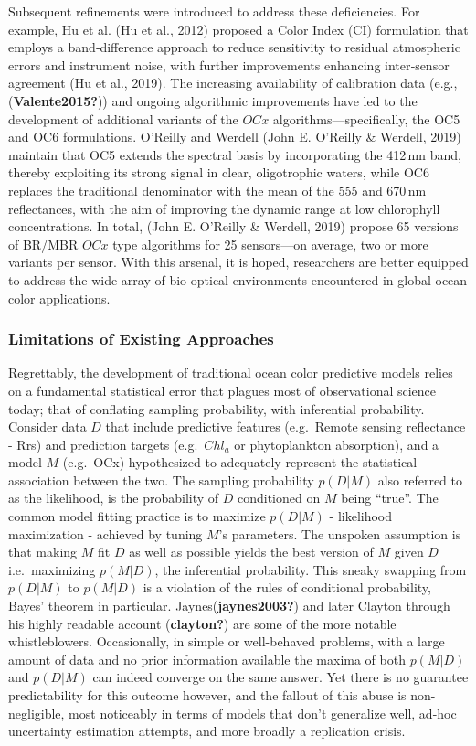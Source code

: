 \documentclass[
]{agujournal2019}
\begin{document}
Subsequent refinements were introduced to address these deficiencies.
For example, Hu et al. (Hu et al., 2012) proposed a Color Index (CI)
formulation that employs a band‑difference approach to reduce
sensitivity to residual atmospheric errors and instrument noise, with
further improvements enhancing inter‑sensor agreement (Hu et al., 2019).
The increasing availability of calibration data (e.g.,
(\textbf{Valente2015?})) and ongoing algorithmic improvements have led
to the development of additional variants of the \(OCx\)
algorithms---specifically, the OC5 and OC6 formulations. O'Reilly and
Werdell (John E. O'Reilly \& Werdell, 2019) maintain that OC5 extends
the spectral basis by incorporating the 412\,nm band, thereby exploiting
its strong signal in clear, oligotrophic waters, while OC6 replaces the
traditional denominator with the mean of the 555 and 670\,nm
reflectances, with the aim of improving the dynamic range at low
chlorophyll concentrations. In total, (John E. O'Reilly \& Werdell,
2019) propose 65 versions of BR/MBR \(OCx\) type algorithms for 25
sensors---on average, two or more variants per sensor. With this
arsenal, it is hoped, researchers are better equipped to address the
wide array of bio‑optical environments encountered in global ocean color
applications.

\subsubsection{Limitations of Existing
Approaches}\label{limitations-of-existing-approaches}

Regrettably, the development of traditional ocean color predictive
models relies on a fundamental statistical error that plagues most of
observational science today; that of conflating sampling probability,
with inferential probability. Consider data \(D\) that include
predictive features (e.g.~Remote sensing reflectance - Rrs) and
prediction targets (e.g.~\(Chl_a\) or phytoplankton absorption), and a
model \(M\) (e.g.~OCx) hypothesized to adequately represent the
statistical association between the two. The sampling probability
\(p(D|M)\) also referred to as the likelihood, is the probability of
\(D\) conditioned on \(M\) being ``true''. The common model fitting
practice is to maximize \(p(D|M)\) - likelihood maximization - achieved
by tuning \(M\)'s parameters. The unspoken assumption is that making
\(M\) fit \(D\) as well as possible yields the best version of \(M\)
given \(D\) i.e.~maximizing \(p(M|D)\), the inferential probability.
This sneaky swapping from \(p(D|M)\) to \(p(M|D)\) is a violation of the
rules of conditional probability, Bayes' theorem in particular.
Jaynes(\textbf{jaynes2003?}) and later Clayton through his highly
readable account (\textbf{clayton?}) are some of the more notable
whistleblowers. Occasionally, in simple or well-behaved problems, with a
large amount of data and no prior information available the maxima of
both \(p(M|D)\) and \(p(D|M)\) can indeed converge on the same answer.
Yet there is no guarantee predictability for this outcome however, and
the fallout of this abuse is non-negligible, most noticeably in terms of
models that don't generalize well, ad-hoc uncertainty estimation
attempts, and more broadly a replication crisis.
\end{document}
